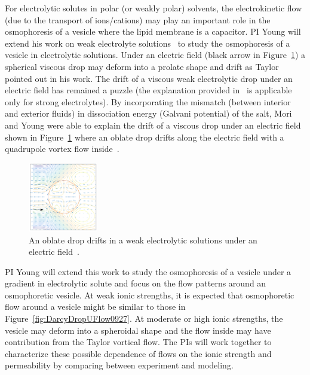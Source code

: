 \documentclass[11pt]{article}
\begin{document}
For electrolytic solutes in polar (or weakly polar) solvents, the
electrokinetic flow (due to the transport of ions/cations) may play an
important role in the osmophoresis of a vesicle where the lipid membrane
is a capacitor.  PI Young will extend his work on weak electrolyte
solutions~\cite{Mori2017_arXiv} to study the osmophoresis of a vesicle
in electrolytic solutions. Under an electric field (black arrow in
Figure~\ref{fig:Mori_fig7}) a spherical viscous drop may deform into a
prolate shape and drift as Taylor pointed out in his work. The drift of
a viscous weak electrolytic drop under an electric field has remained a
puzzle (the explanation provided in~\cite{Schnitzer2015_JFM} is
applicable only for strong electrolytes).  By incorporating the mismatch
(between interior and exterior fluids) in dissociation energy (Galvani
potential) of the salt, Mori and Young were able to explain the drift of
a viscous drop under an electric field shown in
Figure~\ref{fig:Mori_fig7} where an oblate drop drifts along the
electric field with a quadrupole vortex flow
inside~\cite{Mori2017_arXiv}.
\begin{figure}
\vspace*{-10pt}
\centerline{\includegraphics[width=1.2in]{figs/Mori2017_arXiv_fig7a.pdf}}
\vspace*{-12pt}
\caption{\label{fig:Mori_fig7} \footnotesize An oblate drop drifts in a
  weak electrolytic solutions under an electric
  field~\cite{Mori2017_arXiv}.}
\end{figure}
% 

PI Young will extend this work to study the osmophoresis of a vesicle
under a gradient in electrolytic solute and focus on the flow patterns
around an osmophoretic vesicle. At weak ionic strengths, it is expected
that osmophoretic flow around a vesicle might be similar to those in
Figure~\ref{fig:DarcyDropUFlow0927}.  At moderate or high ionic
strengths, the vesicle may deform into a spheroidal shape and the flow
inside may have contribution from the Taylor vortical flow. The PIs will
work together to characterize these possible dependence of flows on the
ionic strength and permeability by comparing between experiment and
modeling.
\end{document}
